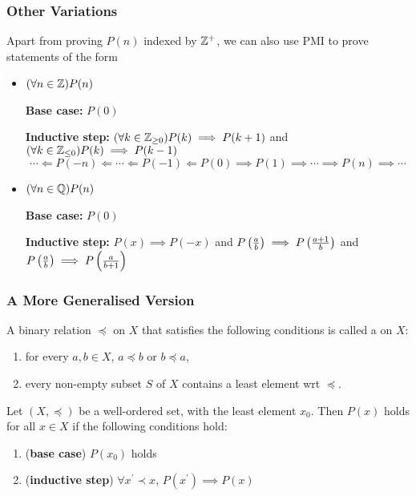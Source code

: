 \subsubsection{Other Variations}
Apart from proving $P(n)$ indexed by $\mathbb Z^+$, we can also use PMI to prove statements of the form
\begin{itemize}
\item $(\forall n\in\mathbb Z) P(n)$

\textbf{Base case:} $P(0)$

\textbf{Inductive step:} $(\forall k\in\mathbb Z_{\ge0}) P(k)\implies P(k+1)$ and $(\forall k\in\mathbb Z_{\le0}) P(k)\implies P(k-1)$
\[ \cdots \Longleftarrow P(-n) \Longleftarrow \cdots \Longleftarrow P(-1) \Longleftarrow P(0) \implies P(1) \implies \cdots \implies P(n) \implies \cdots \]

\item $(\forall n\in\mathbb Q) P(n)$

\textbf{Base case:} $P(0)$

\textbf{Inductive step:} $P(x)\implies P(-x)$ and $P\left(\frac{a}{b}\right)\implies P\left(\frac{a+1}{b}\right)$ and $P\left(\frac{a}{b}\right)\implies P\left(\frac{a}{b+1}\right)$
\end{itemize}

\subsubsection{A More Generalised Version}
\begin{definition}
A binary relation $\preceq$ on $X$ that satisfies the following conditions is called a  on $X$:
\begin{enumerate}[label=(\roman*)]
\item for every $a,b\in X$, $a\preceq b$ or $b\preceq a$,
\item every non-empty subset $S$ of $X$ contains a least element wrt $\preceq$.
\end{enumerate}
\end{definition}

\begin{theorem}
Let $(X,\preceq)$ be a well-ordered set, with the least element $x_0$. Then $P(x)$ holds for all $x\in X$ if the following conditions hold:
\begin{enumerate}[label=(\roman*)]
\item (\textbf{base case}) $P(x_0)$ holds
\item (\textbf{inductive step}) $\forall x^\prime\prec x$, $P(x^\prime)\implies P(x)$
\end{enumerate}
\end{theorem}

